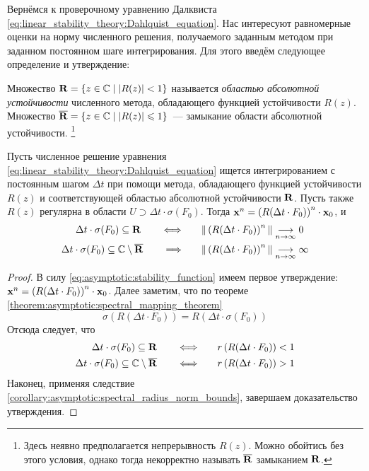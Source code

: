 Вернёмся к проверочному уравнению Далквиста \eqref{eq:linear_stability_theory:Dahlquist_equation}.
Нас интересуют равномерные оценки на норму численного решения, получаемого заданным методом при заданном постоянном шаге интегрирования.
Для этого введём следующее определение и утверждение:

\begin{definition}
    \label{definition:asymptotic:stability_region}
    Множество $ \mathbf{R} = \{ z \in \mathbb{C} \mid | R(z) | < 1 \} $ называется \emph{областью абсолютной устойчивости} численного метода, обладающего функцией устойчивости $ R(z) $.
    Множество $ \overline{\mathbf{R}} = \{ z \in \mathbb{C} \mid | R(z) | \leqslant 1 \} $~--- замыкание области абсолютной устойчивости.%
    \footnote{Здесь неявно предполагается непрерывность $ R(z) $.
    Можно обойтись без этого условия, однако тогда некорректно называть $ \overline{\mathbf{R}} $ замыканием $ \mathbf{R} $.}
\end{definition}

\begin{statement}
    \label{statement:asymptotic:linear_numerical_stability}
    Пусть численное решение уравнения \eqref{eq:linear_stability_theory:Dahlquist_equation}
    ищется интегрированием с постоянным шагом $ \Delta t $
    при помощи метода, обладающего функцией устойчивости $ R(z) $ и соответствующей областью абсолютной устойчивости $ \mathbf{R} $.
    Пусть также $ R(z) $ регулярна в области $ U \supset \Delta t \cdot \sigma(F_0) $.
    Тогда $ \mathbf{x}^n = \left( R(\Delta t \cdot F_0) \right)^n \cdot \mathbf{x}_0 $, и
    \begin{align}
        \Delta t \cdot \sigma(F_0) \subseteq \mathbf{R} \qquad \Longleftrightarrow \qquad & \| \left( R(\Delta t \cdot F_0) \right)^n \| \underset{n \to \infty}{\longrightarrow} 0 \\
        \Delta t \cdot \sigma(F_0) \subseteq \mathbb{C} \setminus \overline{\mathbf{R}} \qquad \Longrightarrow \qquad & \| \left( R(\Delta t \cdot F_0) \right)^n \| \underset{n \to \infty}{\longrightarrow} \infty
    \end{align}
\end{statement}

\begin{proof}
    В силу \eqref{eq:asymptotic:stability_function} имеем первое утверждение:
    $ \mathbf{x}^n = \left( R(\Delta t \cdot F_0) \right)^n \cdot \mathbf{x}_0 $.
    Далее заметим, что по теореме \ref{theorem:asymptotic:spectral_mapping_theorem}
    \[
        \sigma\left( R(\Delta t \cdot F_0) \right) = R\left( \Delta t \cdot \sigma(F_0) \right)
    \]
    Отсюда следует, что
    \begin{align}
        \Delta t \cdot \sigma(F_0) \subseteq \mathbf{R} \qquad \Longleftrightarrow \qquad & r\left( R(\Delta t \cdot F_0) \right) < 1 \\
        \Delta t \cdot \sigma(F_0) \subseteq \mathbb{C} \setminus \overline{\mathbf{R}} \qquad \Longleftrightarrow \qquad & r\left( R(\Delta t \cdot F_0) \right) > 1
    \end{align}
    Наконец, применяя следствие \ref{corollary:asymptotic:spectral_radius_norm_bounds}, завершаем доказательство утверждения.
\end{proof}

